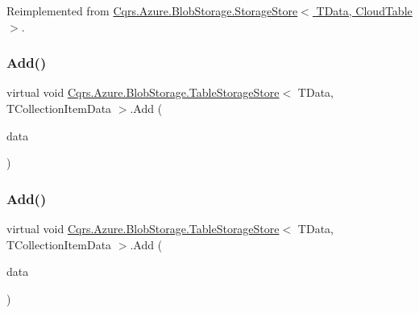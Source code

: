 Reimplemented from \hyperlink{classCqrs_1_1Azure_1_1BlobStorage_1_1StorageStore_a989d749e5f9efc10b1a416feec02657d}{Cqrs.\+Azure.\+Blob\+Storage.\+Storage\+Store$<$ T\+Data, Cloud\+Table $>$}.

\mbox{\label{classCqrs_1_1Azure_1_1BlobStorage_1_1TableStorageStore_a120c6fbb947cf4d37f60335df0182008}} 
\subsubsection{\texorpdfstring{Add()}{Add()}\hspace{0.1cm}{\footnotesize\ttfamily [4/6]}}
{\footnotesize\ttfamily virtual void \hyperlink{classCqrs_1_1Azure_1_1BlobStorage_1_1TableStorageStore}{Cqrs.\+Azure.\+Blob\+Storage.\+Table\+Storage\+Store}$<$ T\+Data, T\+Collection\+Item\+Data $>$.Add (\begin{DoxyParamCaption}\item[{I\+Enumerable$<$ I\+Table\+Entity $>$}]{data }\end{DoxyParamCaption})\hspace{0.3cm}{\ttfamily [virtual]}}

\mbox{\label{classCqrs_1_1Azure_1_1BlobStorage_1_1TableStorageStore_ae48083bacf8a74175122e7618ae2a605}} 
\subsubsection{\texorpdfstring{Add()}{Add()}\hspace{0.1cm}{\footnotesize\ttfamily [5/6]}}
{\footnotesize\ttfamily virtual void \hyperlink{classCqrs_1_1Azure_1_1BlobStorage_1_1TableStorageStore}{Cqrs.\+Azure.\+Blob\+Storage.\+Table\+Storage\+Store}$<$ T\+Data, T\+Collection\+Item\+Data $>$.Add (\begin{DoxyParamCaption}\item[{T\+Collection\+Item\+Data}]{data }\end{DoxyParamCaption})\hspace{0.3cm}{\ttfamily [virtual]}}

